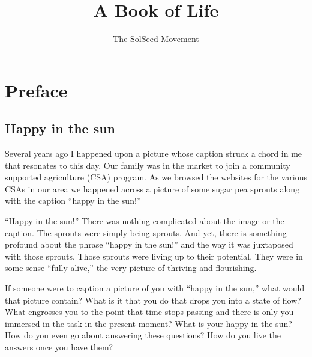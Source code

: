 \documentclass[ebook,11pt,openany,twoside]{memoir}
\newcommand{\imagefacingchapter}[1]{
  \cleartoverso
  \clearpage \null
  \thispagestyle{cleared}
  \AddToShipoutPictureBG*{%
    \AtStockLowerLeft{%
      \texttt{[image: \#1]}
    }
  }
  \clearpage
}
\begin{document}
\title{\textbf{A Book of Life}}
\author{The SolSeed Movement}
\begin{titlingpage}
\maketitle
\end{titlingpage}




\imagefacingchapter{images/sprout-is-happy-in-the-sun}
\chapter*{Preface}
\pagestyle{plain}

\section*{Happy in the sun}

Several years ago I happened upon a picture whose caption struck a chord in me
that resonates to this day. Our family was in the market to join a community
supported agriculture (CSA) program. As we browsed the websites for the various
CSAs in our area we happened across a picture of some sugar pea sprouts along
with the caption ``happy in the sun!''

``Happy in the sun!'' There was nothing complicated about the image or the
caption. The sprouts were simply being sprouts. And yet, there is something
profound about the phrase ``happy in the sun!'' and the way it was juxtaposed
with those sprouts. Those sprouts were living up to their potential. They were
in some sense ``fully alive,'' the very picture of thriving and flourishing.

If someone were to caption a picture of you with ``happy in the sun,'' what
would that picture contain? What is it that you do that drops you into a state
of flow? What engrosses you to the point that time stops passing and there is
only you immersed in the task in the present moment? What is your happy in the
sun? How do you even go about answering these questions? How do you live the
answers once you have them?
\end{document}
